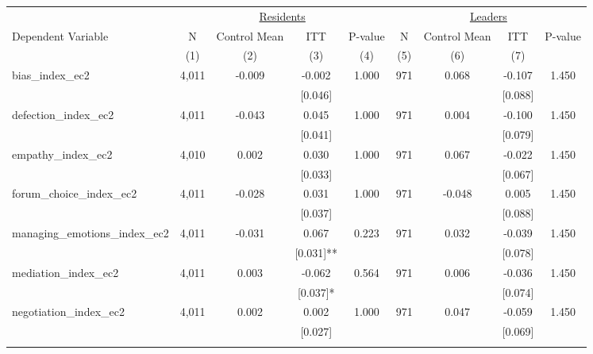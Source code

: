 \begin{tabular}{lcccccccc}
\hline \noalign{\smallskip} & \multicolumn{4}{c}{\uline{\hfill Residents \hfill}} & \multicolumn{4}{c}{\uline{\hfill Leaders \hfill}}\\
Dependent Variable & N & Control Mean & ITT & P-value & N & Control Mean & ITT & P-value\\
 & (1) & (2) & (3) & (4) & (5) & (6) & (7) & \\
\noalign{\smallskip}\hline \noalign{\smallskip}bias_index_ec2 & 4,011 & -0.009 & -0.002 & 1.000 & 971 & 0.068 & -0.107 & 1.450\\
 &  &  & [0.046] &  &  &  & [0.088] & \\
defection_index_ec2 & 4,011 & -0.043 & 0.045 & 1.000 & 971 & 0.004 & -0.100 & 1.450\\
 &  &  & [0.041] &  &  &  & [0.079] & \\
empathy_index_ec2 & 4,010 & 0.002 & 0.030 & 1.000 & 971 & 0.067 & -0.022 & 1.450\\
 &  &  & [0.033] &  &  &  & [0.067] & \\
forum_choice_index_ec2 & 4,011 & -0.028 & 0.031 & 1.000 & 971 & -0.048 & 0.005 & 1.450\\
 &  &  & [0.037] &  &  &  & [0.088] & \\
managing_emotions_index_ec2 & 4,011 & -0.031 & 0.067 & 0.223 & 971 & 0.032 & -0.039 & 1.450\\
 &  &  & [0.031]** &  &  &  & [0.078] & \\
mediation_index_ec2 & 4,011 & 0.003 & -0.062 & 0.564 & 971 & 0.006 & -0.036 & 1.450\\
 &  &  & [0.037]* &  &  &  & [0.074] & \\
negotiation_index_ec2 & 4,011 & 0.002 & 0.002 & 1.000 & 971 & 0.047 & -0.059 & 1.450\\
 &  &  & [0.027] &  &  &  & [0.069] & \\
\noalign{\smallskip}\hline\end{tabular}

